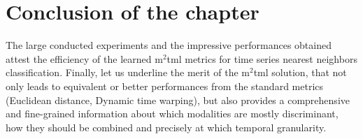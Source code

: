 \section{Conclusion of the chapter}
The large conducted experiments and the impressive performances obtained  attest the efficiency of the   learned {\sc m}$^2${\sc tml} metrics for time series nearest neighbors classification. Finally, let us underline the merit of the {\sc m}$^2${\sc tml}  solution, that not only leads to equivalent or better performances from the standard metrics (Euclidean distance, Dynamic time warping), but also provides a comprehensive and fine-grained information about  which modalities are mostly discriminant, how they should be combined and precisely at which temporal granularity. 